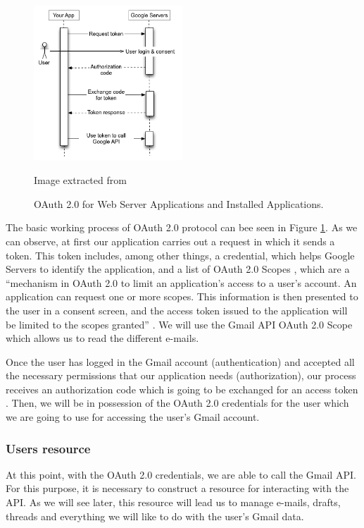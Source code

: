\begin{figure}[h]
	\centering%
	\includegraphics[width = 0.5\textwidth]{Imagenes/Bitmap/webflow.png}%
	\caption{OAuth 2.0 for Web Server Applications and Installed Applications.}%
	Image extracted from \cite{oauthforgoogle}
	\label{fig:oauth}
\end{figure}

The basic working process of OAuth 2.0 protocol can bee seen in Figure \ref{fig:oauth}. As we can observe, at first our application carries out a request in which it sends a token. This token includes, among other things, a credential, which helps Google Servers  to identify the application, and a list of OAuth 2.0 Scopes \citep{oauth-scopes-google}, which are a ``mechanism  in OAuth 2.0 to limit an application's access to a user's account. An application can request one or more scopes. This information is then presented to the user in a consent screen, and the access token issued to the application will be limited to the scopes granted'' \citep{oauth-scopes}. We will use the Gmail API OAuth 2.0 Scope which allows us to read the different e-mails.

Once the user has logged in the Gmail account (authentication) and accepted all the necessary permissions that our application needs (authorization), our process receives an authorization code which is going to be exchanged for an access token \citep{oauth-exchange}. Then, we will be in possession of the OAuth 2.0 credentials for the user \citep{oauth2.credentials} which we are going to use for accessing the user's Gmail account.

\subsubsection{Users resource}\label{sssect:usersres}
At this point, with the OAuth 2.0 credentials, we are able to call the Gmail API. For this purpose, it is necessary to construct a resource \citep[/v1/reference]{gmailAPI} for interacting with the API. As we will see later, this resource will lead us to manage e-mails, drafts, threads and everything we will like to do with the user's Gmail data.

